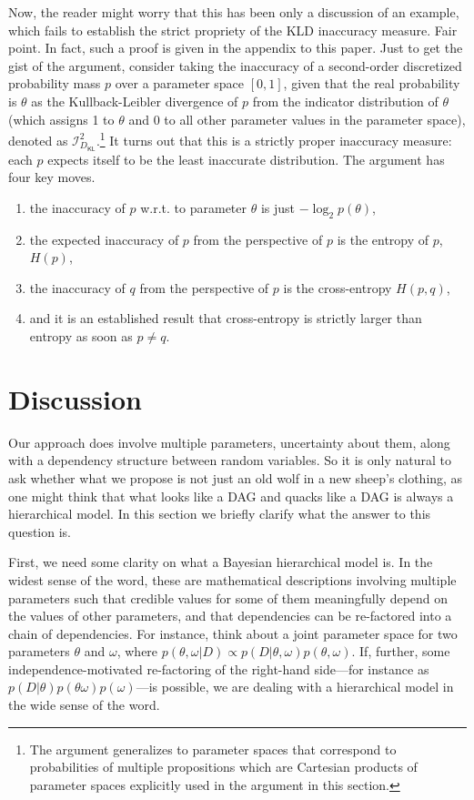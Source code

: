 \documentclass[
  10pt,
  dvipsnames,enabledeprecatedfontcommands]{scrartcl}
\newcommand{\dkl}{D_{\mathsf{KL}}} %
\begin{document}
Now, the reader might worry that this has been only a discussion of an
example, which fails to establish the strict propriety of the KLD
inaccuracy measure. Fair point. In fact, such a proof is given in the
appendix to this paper. Just to get the gist of the argument, consider
taking the inaccuracy of a second-order discretized probability mass
\(p\) over a parameter space \([0,1]\), given that the real probability
is \(\theta\) as the Kullback-Leibler divergence of \(p\) from the
indicator distribution of \(\theta\) (which assigns 1 to \(\theta\) and
0 to all other parameter values in the parameter space), denoted as
\(\mathcal{I}_{\dkl}^2\).\footnote{The argument generalizes to parameter
  spaces that correspond to probabilities of multiple propositions which
  are Cartesian products of parameter spaces explicitly used in the
  argument in this section.} It turns out that this is a strictly proper
inaccuracy measure: each \(p\) expects itself to be the least inaccurate
distribution. The argument has four key moves.

\begin{enumerate}
\item the inaccuracy of $p$ w.r.t. to parameter $\theta$ is just $- \log_2 p(\theta)$,
\item  the expected inaccuracy of $p$ from the perspective of $p$ is the entropy of $p$, $H(p)$,
\item  the inaccuracy of $q$ from the perspective of $p$ is the cross-entropy $H(p,q)$,
\item and it is an established result that cross-entropy is strictly larger than entropy as soon as $p\neq q$.
  \end{enumerate}

\hypertarget{discussion}{%
\section{Discussion}\label{discussion}}

Our approach does involve multiple parameters, uncertainty about them,
along with a dependency structure between random variables. So it is
only natural to ask whether what we propose is not just an old wolf in a
new sheep's clothing, as one might think that what looks like a DAG and
quacks like a DAG is always a hierarchical model. In this section we
briefly clarify what the answer to this question is.

First, we need some clarity on what a Bayesian hierarchical model is. In
the widest sense of the word, these are mathematical descriptions
involving multiple parameters such that credible values for some of them
meaningfully depend on the values of other parameters, and that
dependencies can be re-factored into a chain of dependencies. For
instance, think about a joint parameter space for two parameters
\(\theta\) and \(\omega\), where
\(p(\theta, \omega \vert D) \propto p(D \vert \theta, \omega)p(\theta, \omega)\).
If, further, some independence-motivated re-factoring of the right-hand
side---for instance as
\(p(D\vert \theta)p(\theta \omega)p(\omega)\)---is possible, we are
dealing with a hierarchical model in the wide sense of the word.
\end{document}
